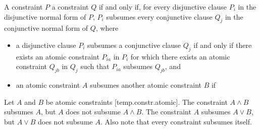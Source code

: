 \documentclass{wg21}
\begin{document}
\pnum
A constraint $P$  a constraint $Q$
if and only if,
for every disjunctive clause $P_i$
in the disjunctive normal form
of $P$, $P_i$ subsumes every conjunctive clause $Q_j$
in the conjunctive normal form of $Q$, where
\begin{itemize}
    \item
    a disjunctive clause $P_i$ subsumes a conjunctive clause $Q_j$ if and only
    if there exists an atomic constraint $P_{ia}$ in $P_i$ for which there exists
    an atomic constraint $Q_{jb}$ in $Q_j$ such that $P_{ia}$ subsumes $Q_{jb}$, and

    \item an atomic constraint $A$ subsumes another atomic constraint
    $B$ if 
\end{itemize}
%
\begin{example}
    Let $A$ and $B$ be atomic constraints [temp.constr.atomic].
    The constraint $A \land B$ subsumes $A$, but $A$ does not subsume $A \land B$.
    The constraint $A$ subsumes $A \lor B$, but $A \lor B$ does not subsume $A$.
    Also note that every constraint subsumes itself.
\end{example}
\end{document}
